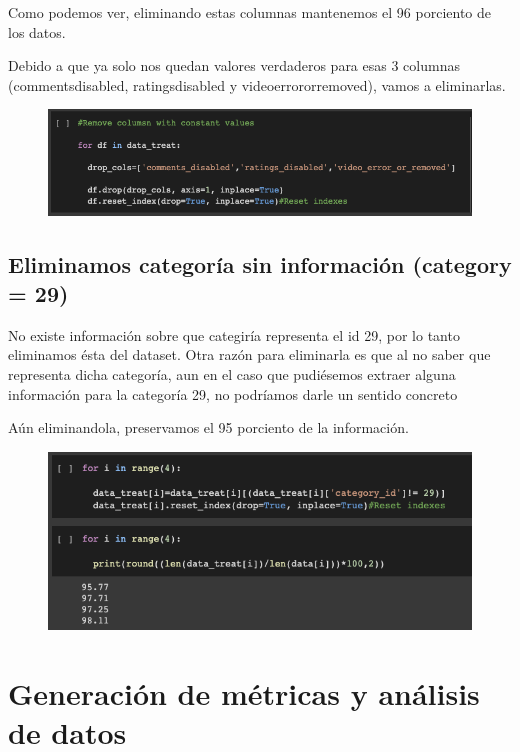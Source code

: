 \documentclass[a4paper,12pt]{article}
\begin{document}
Como podemos ver, eliminando estas columnas mantenemos el 96 porciento de los datos.

Debido a que ya solo nos quedan valores verdaderos para esas 3 columnas (comments{\textunderscore}disabled, ratings{\textunderscore}disabled y video{\textunderscore}error{\textunderscore}or{\textunderscore}removed), vamos a eliminarlas.
\begin{figure}[h!]
\centering
\includegraphics[width=13cm]{data_selection_2.png}
\end{figure}


\subsection{Eliminamos categor\'ia sin informaci\'on (category = 29)}

No existe informaci\'on sobre que categir\'ia representa el id 29, por lo tanto eliminamos \'esta del dataset. Otra raz\'on para eliminarla es que al no saber que representa dicha categor\'ia, aun en el caso que pudi\'esemos extraer alguna informaci\'on para la categor\'ia 29, no podr\'iamos darle un sentido concreto

A\'un eliminandola, preservamos el 95 porciento de la informaci\'on.

\begin{figure}[h!]
\centering
\includegraphics[width=13cm]{remove_category.png}
\end{figure}





\section[item_metricas]{Generaci\'on de m\'etricas y an\'alisis de datos}
\end{document}
